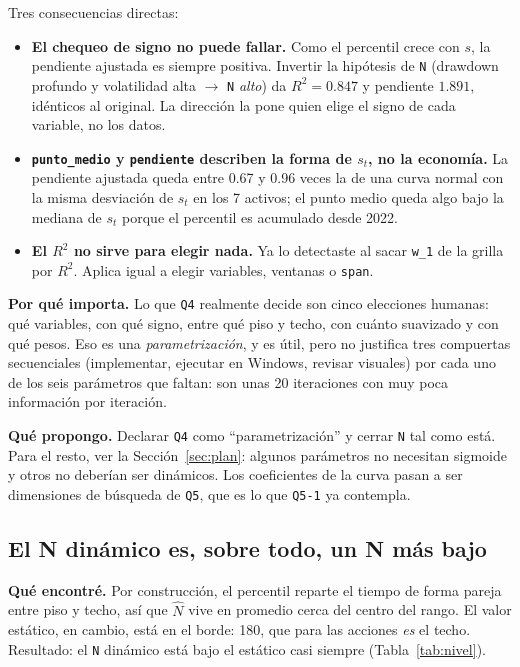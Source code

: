 \documentclass[11pt,a4paper]{article}
\newcommand{\code}[1]{\texttt{\small #1}}
\begin{document}
Tres consecuencias directas:
\begin{itemize}[leftmargin=1.2em]
  \item \textbf{El chequeo de signo no puede fallar.} Como el percentil crece con $s$, la pendiente
        ajustada es siempre positiva. Invertir la hipótesis de \code{N} (drawdown profundo y volatilidad
        alta $\rightarrow$ \code{N} \emph{alto}) da $R^2=0.847$ y pendiente $1.891$, idénticos al original.
        La dirección la pone quien elige el signo de cada variable, no los datos.
  \item \textbf{\code{punto\_medio} y \code{pendiente} describen la forma de $s_t$, no la economía.}
        La pendiente ajustada queda entre 0.67 y 0.96 veces la de una curva normal con la misma
        desviación de $s_t$ en los 7 activos; el punto medio queda algo bajo la mediana de $s_t$ porque
        el percentil es acumulado desde 2022.
  \item \textbf{El $R^2$ no sirve para elegir nada.} Ya lo detectaste al sacar \code{w\_1} de la grilla
        por $R^2$. Aplica igual a elegir variables, ventanas o \code{span}.
\end{itemize}

\textbf{Por qué importa.} Lo que \code{Q4} realmente decide son cinco elecciones humanas: qué
variables, con qué signo, entre qué piso y techo, con cuánto suavizado y con qué pesos. Eso es una
\emph{parametrización}, y es útil, pero no justifica tres compuertas secuenciales (implementar, ejecutar
en Windows, revisar visuales) por cada uno de los seis parámetros que faltan: son unas 20 iteraciones
con muy poca información por iteración.

\textbf{Qué propongo.} Declarar \code{Q4} como ``parametrización'' y cerrar \code{N} tal como está. Para
el resto, ver la Sección~\ref{sec:plan}: algunos parámetros no necesitan sigmoide y otros no deberían
ser dinámicos. Los coeficientes de la curva pasan a ser dimensiones de búsqueda de \code{Q5}, que es lo
que \code{Q5-1} ya contempla.

\subsection{El N dinámico es, sobre todo, un N más bajo}\label{sec:nivel}

\textbf{Qué encontré.} Por construcción, el percentil reparte el tiempo de forma pareja entre piso y
techo, así que $\hat N$ vive en promedio cerca del centro del rango. El valor estático, en cambio,
está en el borde: 180, que para las acciones \emph{es} el techo. Resultado: el \code{N} dinámico está
bajo el estático casi siempre (Tabla~\ref{tab:nivel}).
\end{document}
